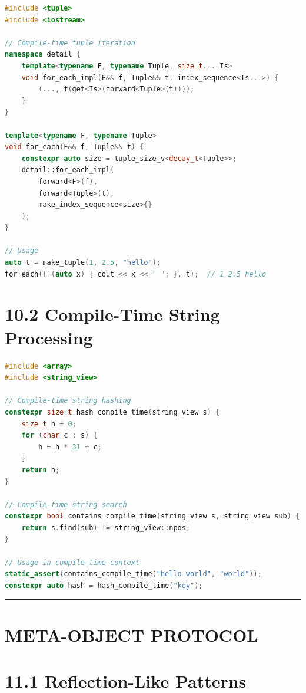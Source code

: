 \begin{lstlisting}[language={C++}]
#include <tuple>
#include <iostream>

// Compile-time tuple iteration
namespace detail {
    template<typename F, typename Tuple, size_t... Is>
    void for_each_impl(F&& f, Tuple&& t, index_sequence<Is...>) {
        (..., f(get<Is>(forward<Tuple>(t))));
    }
}

template<typename F, typename Tuple>
void for_each(F&& f, Tuple&& t) {
    constexpr auto size = tuple_size_v<decay_t<Tuple>>;
    detail::for_each_impl(
        forward<F>(f),
        forward<Tuple>(t),
        make_index_sequence<size>{}
    );
}

// Usage
auto t = make_tuple(1, 2.5, "hello");
for_each([](auto x) { cout << x << " "; }, t);  // 1 2.5 hello
\end{lstlisting}

\hypertarget{compile-time-string-processing}{%
\section{10.2 Compile-Time String
Processing}\label{compile-time-string-processing}}

\begin{lstlisting}[language={C++}]
#include <array>
#include <string_view>

// Compile-time string hashing
constexpr size_t hash_compile_time(string_view s) {
    size_t h = 0;
    for (char c : s) {
        h = h * 31 + c;
    }
    return h;
}

// Compile-time string search
constexpr bool contains_compile_time(string_view s, string_view sub) {
    return s.find(sub) != string_view::npos;
}

// Usage in compile-time context
static_assert(contains_compile_time("hello world", "world"));
constexpr auto hash = hash_compile_time("key");
\end{lstlisting}

\begin{center}\rule{0.5\linewidth}{0.5pt}\end{center}

\hypertarget{meta-object-protocol}{%
\section{META-OBJECT PROTOCOL}\label{meta-object-protocol}}

\hypertarget{reflection-like-patterns}{%
\section{11.1 Reflection-Like Patterns}\label{reflection-like-patterns}}

